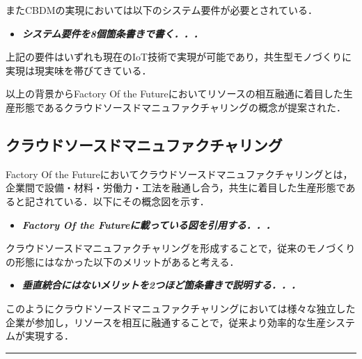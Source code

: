 またCBDMの実現においては以下のシステム要件が必要とされている\cite{WU2015}．

\begin{itemize}
\tightlist
\item
  \textbf{\emph{システム要件を8個箇条書きで書く．．．}}
\end{itemize}

上記の要件はいずれも現在のIoT技術で実現が可能であり，共生型モノづくりに実現は現実味を帯びてきている．

以上の背景からFactory Of the
Futureにおいてリソースの相互融通に着目した生産形態であるクラウドソースドマニュファクチャリングの概念が提案された\cite{Factory2015}．

\hypertarget{ux30afux30e9ux30a6ux30c9ux30bdux30fcux30b9ux30c9ux30deux30cbux30e5ux30d5ux30a1ux30afux30c1ux30e3ux30eaux30f3ux30b0}{%
\subsection{クラウドソースドマニュファクチャリング}\label{ux30afux30e9ux30a6ux30c9ux30bdux30fcux30b9ux30c9ux30deux30cbux30e5ux30d5ux30a1ux30afux30c1ux30e3ux30eaux30f3ux30b0}}

Factory Of the
Futureにおいてクラウドソースドマニュファクチャリングとは，企業間で設備・材料・労働力・工法を融通し合う，共生に着目した生産形態であると記されている\cite{Factory2015}．以下にその概念図を示す．

\begin{itemize}
\tightlist
\item
  \textbf{\emph{Factory Of the Futureに載っている図を引用する．．．}}
\end{itemize}

クラウドソースドマニュファクチャリングを形成することで，従来のモノづくりの形態にはなかった以下のメリットがあると考える\cite{KATSUMURA2016}．

\begin{itemize}
\tightlist
\item
  \textbf{\emph{垂直統合にはないメリットを2つほど箇条書きで説明する．．．}}
\end{itemize}

このようにクラウドソースドマニュファクチャリングにおいては様々な独立した企業が参加し，リソースを相互に融通することで，従来より効率的な生産システムが実現する．

\begin{center}\rule{0.5\linewidth}{0.5pt}\end{center}

